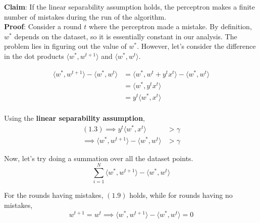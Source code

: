 \documentclass{report}
\begin{document}
\noindent \textbf{Claim}: If the linear separability assumption holds, the perceptron makes a finite number of mistakes during the run of the algorithm. \\

\noindent \textbf{Proof}: Consider a round $t$ where the perceptron made a mistake. By definition, $w^*$ depends on the dataset, so it is essentially constant in our analysis. The problem lies in figuring out the value of $w^*$. However, let's consider the difference in the dot products $\langle w^*,w^{t+1} \rangle$ and $\langle w^*,w^t \rangle$.

\begin{align}
  \langle w^*,w^{t+1} \rangle - \langle w^*,w^t \rangle & = \langle w^*,w^t + y^tx^t \rangle - \langle w^*,w^t \rangle \\
                                                        & = \langle w^*,y^tx^t \rangle                                 \\
                                                        & = y^t\langle w^*,x^t \rangle                                 \\
\end{align}

\noindent Using the \textbf{linear separability assumption},
\begin{align}
  (1.3) \implies y^t\langle w^*,x^t \rangle                      & > \gamma \\
  \implies \langle w^*,w^{t+1} \rangle - \langle w^*,w^t \rangle & > \gamma
\end{align}

\noindent Now, let's try doing a summation over all the dataset points.
$$
  \overset{N}{\underset{i=1}{\sum}} \langle w^*,w^{t+1} \rangle - \langle w^*,w^t \rangle
$$

\noindent For the rounds having mistakes, $(1.9)$ holds, while for rounds having no mistakes,
$$
  w^{t+1} = w^t \implies \langle w^*,w^{t+1} \rangle - \langle w^*,w^t \rangle = 0
$$
\end{document}

